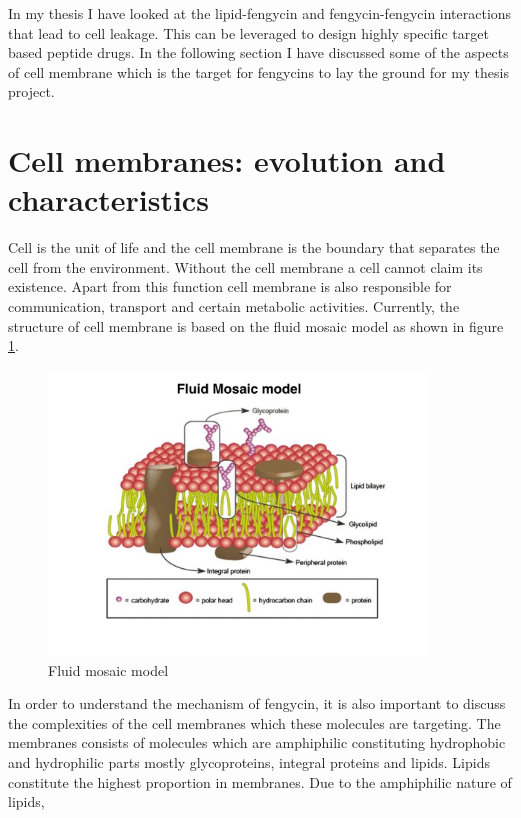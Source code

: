 In my thesis I have looked at the lipid-fengycin and fengycin-fengycin interactions that lead to cell leakage. This can be leveraged to design highly specific target based peptide drugs.
In the following section I have discussed some of the aspects of cell membrane which is the target for fengycins to lay the ground for my thesis project.

\section{Cell membranes: evolution and characteristics}
Cell is the unit of life and the cell membrane is the boundary that separates the 
cell from the environment. Without the cell membrane a cell cannot claim its 
existence. Apart from this function cell membrane is also responsible for 
communication, transport and certain metabolic activities. Currently, the structure of cell 
membrane is based on the fluid mosaic model as shown in figure \ref{fig:fluid_mosaic}.\cite{Nicholson1972}
\begin{figure}
   \label{fig:fluid_mosaic}
   \centering
   \includegraphics[width=0.9\textwidth]{chapter1_figs/fluid_mosaic_model.jpeg}
   \caption{Fluid mosaic model \cite{Lombard2014}}
\end{figure}
In order to understand the mechanism of fengycin, it is also important 
to discuss the complexities of the cell membranes which these 
molecules are targeting. 
The membranes consists of molecules which are amphiphilic constituting hydrophobic and 
hydrophilic parts mostly glycoproteins, integral proteins and lipids. Lipids constitute 
the highest proportion in membranes. Due to the amphiphilic nature of lipids, 
